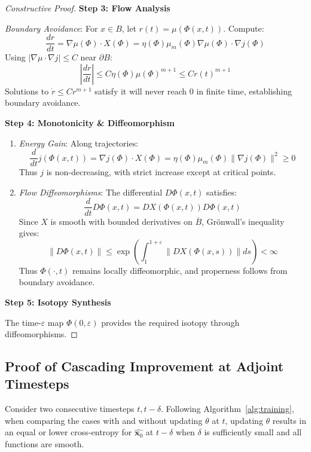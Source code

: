\begin{proof}[Constructive Proof]
\textbf{Step 3: Flow Analysis}

\textit{Boundary Avoidance}: For \( x \in B \), let \( r(t) = \mu(\Phi(x,t)) \). Compute:
\[
\frac{dr}{dt} = \nabla \mu(\Phi) \cdot X(\Phi) = \eta(\Phi)\mu_m(\Phi)\nabla \mu(\Phi) \cdot \nabla j(\Phi)
\]
    Using \( |\nabla \mu \cdot \nabla j| \leq C \) near \( \partial B \):
\[
\left|\frac{dr}{dt}\right| \leq C\eta(\Phi)\mu(\Phi)^{m+1} \leq Cr(t)^{m+1}
\]
Solutions to \( \dot{r} \leq Cr^{m+1} \) satisfy it will never reach 0 in finite time, establishing boundary avoidance.


\textbf{Step 4: Monotonicity \& Diffeomorphism}

\begin{enumerate}
\item \textit{Energy Gain}: Along trajectories:
\[
\frac{d}{dt}j(\Phi(x,t)) = \nabla j(\Phi) \cdot X(\Phi) = \eta(\Phi)\mu_m(\Phi)\|\nabla j(\Phi)\|^2 \geq 0
\]
Thus \( j \) is non-decreasing, with strict increase except at critical points.

\item \textit{Flow Diffeomorphisms}: The differential \( D\Phi(x,t) \) satisfies:
\[
\frac{d}{dt}D\Phi(x,t) = DX(\Phi(x,t))D\Phi(x,t)
\]
Since \( X \) is smooth with bounded derivatives on \( \overline{B} \), Grönwall's inequality gives:
\[
\|D\Phi(x,t) \| \leq \exp\left(\int_1^{1+\varepsilon} \|DX(\Phi(x,s))\| ds\right) < \infty
\]
Thus \( \Phi(\cdot,t) \) remains locally diffeomorphic, and properness follows from boundary avoidance.
\end{enumerate}

\textbf{Step 5: Isotopy Synthesis}

The time-\( \varepsilon \) map \( \Phi(0,\varepsilon) \) provides the required isotopy through diffeomorphisms.
\end{proof}
\subsection{Proof of Cascading Improvement at Adjoint Timesteps}
\label{proof cascading improvement}
\begin{proposition}
\label{cascading_improvement_proof}

Consider two consecutive timesteps  $t, t - \delta$. Following Algorithm~\ref{alg:training}, when comparing the cases with and without updating  $\theta$  at  $t$, updating  $\theta$  results in an equal or lower cross-entropy for  $\widehat{\mathbf{x}_0}$ at $t-\delta$ when  $\delta$  is sufficiently small and all functions are smooth.
\end{proposition}




